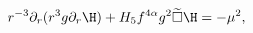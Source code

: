\begin{equation}
r^{-3}\partial_r(r^3g\partial_r\H)+H_5f^{4\alpha}g^2\widetilde{\square}\H
=-\mu^2,
\end{equation}

